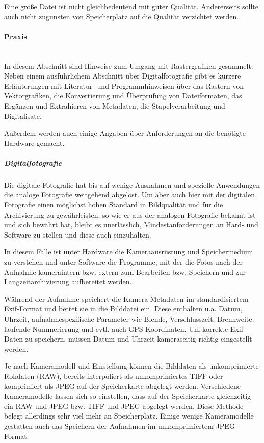 Eine große Datei ist nicht gleichbedeutend mit guter Qualität. Andererseits sollte auch nicht zugunsten von Speicherplatz auf die Qualität verzichtet werden.


\paragraph{Praxis} ~\\

In diesem Abschnitt sind Hinweise zum Umgang mit Rastergrafiken gesammelt. Neben einem ausführlichem Abschnitt über Digitalfotografie gibt es kürzere Erläuterungen mit Literatur- und Programmhinweisen über das Rastern von Vektorgrafiken, die Konvertierung und Überprüfung von Dateiformaten, das Ergänzen und Extrahieren von Metadaten, die Stapelverarbeitung und Digitalisate. 

Außerdem werden auch einige Angaben über Anforderungen an die benötigte Hardware gemacht.

\subparagraph{Digitalfotografie} Die digitale Fotografie hat bis auf wenige Ausnahmen und spezielle Anwendungen die analoge Fotografie weitgehend abgelöst. Um aber auch hier mit der digitalen Fotografie einen möglichst hohen Standard in Bildqualität und für die Archivierung zu gewährleisten, so wie er aus der analogen Fotografie bekannt ist und sich bewährt hat, bleibt es unerlässlich, Mindestanforderungen an Hard- und Software zu stellen und diese auch einzuhalten. 

In diesem Falle ist unter Hardware die Kameraausrüstung und Speichermedium zu verstehen und unter Software die Programme, mit der die Fotos nach der Aufnahme kameraintern bzw. extern zum Bearbeiten bzw. Speichern und zur Langzeitarchivierung aufbereitet werden.

Während der Aufnahme speichert die Kamera Metadaten im standardisiertem Exif-Format und bettet sie in die Bilddatei ein. Diese enthalten u.a. Datum, Uhrzeit, aufnahmespezifische Parameter wie Blende, Verschlusszeit, Brennweite, laufende Nummerierung und evtl. auch GPS-Koordinaten. Um korrekte Exif-Daten zu speichern, müssen Datum und Uhrzeit kameraseitig richtig eingestellt werden.

Je nach Kameramodell und Einstellung können die Bilddaten als unkomprimierte Rohdaten (RAW), bereits interpoliert als unkomprimiertes TIFF oder komprimiert als JPEG auf der Speicherkarte abgelegt werden. Verschiedene Kameramodelle lassen sich so einstellen, dass auf der Speicherkarte gleichzeitig ein RAW und JPEG bzw. TIFF und JPEG abgelegt werden. Diese Methode belegt allerdings sehr viel mehr an Speicherplatz. Einige wenige Kameramodelle gestatten auch das Speichern der Aufnahmen im unkomprimiertem JPEG-Format.

